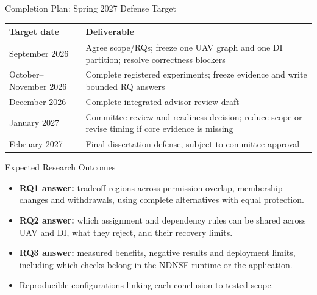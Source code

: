 \begin{frame}{Completion Plan: Spring 2027 Defense Target}
\small
\begin{tabularx}{\linewidth}{>{\raggedright\arraybackslash}p{.25\linewidth}X}
\toprule Target date & Deliverable\\\midrule
September 2026 & Agree scope/RQs; freeze one UAV graph and one DI partition; resolve correctness blockers\\\midrule
October--November 2026 & Complete registered experiments; freeze evidence and write bounded RQ answers\\\midrule
December 2026 & Complete integrated advisor-review draft\\\midrule
January 2027 & Committee review and readiness decision; reduce scope or revise timing if core evidence is missing\\\midrule
February 2027 & Final dissertation defense, subject to committee approval\\\bottomrule
\end{tabularx}
\vspace{2mm}
\end{frame}

\begin{frame}{Expected Research Outcomes}
\begin{itemize}
\item \textbf{RQ1 answer:} tradeoff regions across permission overlap, membership changes and withdrawals, using complete alternatives with equal protection.
\item \textbf{RQ2 answer:} which assignment and dependency rules can be shared across UAV and DI, what they reject, and their recovery limits.
\item \textbf{RQ3 answer:} measured benefits, negative results and deployment limits, including which checks belong in the NDNSF runtime or the application.
\item Reproducible configurations linking each conclusion to tested scope.
\end{itemize}
\end{frame}


